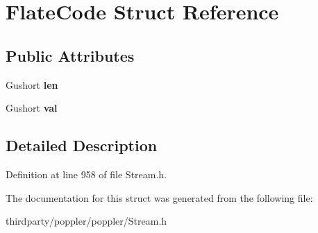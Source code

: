 \hypertarget{struct_flate_code}{}\section{Flate\+Code Struct Reference}
\label{struct_flate_code}
\subsection*{Public Attributes}
\begin{DoxyCompactItemize}
\item 
\mbox{\label{struct_flate_code_a5c7e05c34d05e29b8cc75f11f664ec61}} 
Gushort {\bfseries len}
\item 
\mbox{\label{struct_flate_code_a513b41ce7f182cd0275eb4adcb899725}} 
Gushort {\bfseries val}
\end{DoxyCompactItemize}


\subsection{Detailed Description}


Definition at line 958 of file Stream.\+h.



The documentation for this struct was generated from the following file\+:\begin{DoxyCompactItemize}
\item 
thirdparty/poppler/poppler/Stream.\+h\end{DoxyCompactItemize}

